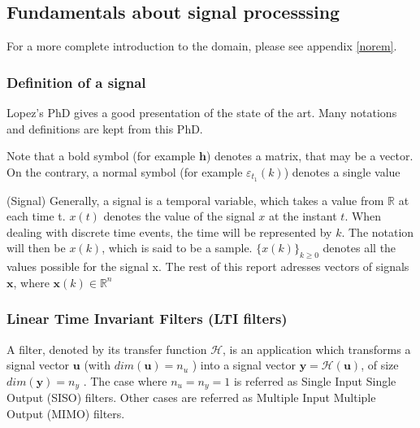	\subsection{Fundamentals about signal processsing }
\begingroup

	\fontsize{7}{9}\selectfont
	For a more complete introduction to the domain, please see appendix \ref{norem}.
\endgroup
	\subsubsection{Definition of a signal}
	Lopez's PhD \cite{lopez} gives a good presentation of the state of the art.
	Many notations and definitions are kept from this PhD.

	Note that a bold symbol (for example $\boldsymbol{h}$) denotes a matrix, that may be a vector.
	On the contrary, a normal symbol (for example $\varepsilon_{t_1}(k)$) denotes a single value

	\begin{thdef}\label{sig} (Signal)
		Generally, a signal is a temporal variable, which takes a value from $\mathbb{R}$ at each time t.
		$x(t)$ denotes the value of the signal $x$ at the instant $t$.
		When dealing with discrete time events, the time will be represented by $k$.
		The notation will then be $x(k)$, which is said to be a sample.
		$\{x(k)\}_{k \geq 0}$ denotes all the values possible for the signal x.
		The rest of this report adresses vectors of signals $\textbf{x}$, where $\textbf{x}(k) \in \mathbb{R}^{n}$
	\end{thdef}


	\subsubsection{Linear Time Invariant Filters (LTI filters)}
	A filter, denoted by its transfer function $\mathcal{H}$, is an application which transforms a signal vector $\boldsymbol{u}$ (with $dim(\boldsymbol{u}) = n_u$ )
	into a signal vector $\boldsymbol{y} = \mathcal{H}(\boldsymbol{u})$, of size $dim(\boldsymbol{y}) = n_y$ . The case where $n_u = n_y = 1$ is referred as Single Input Single Output
	(SISO) filters. Other cases are referred as Multiple Input Multiple Output (MIMO) filters.

